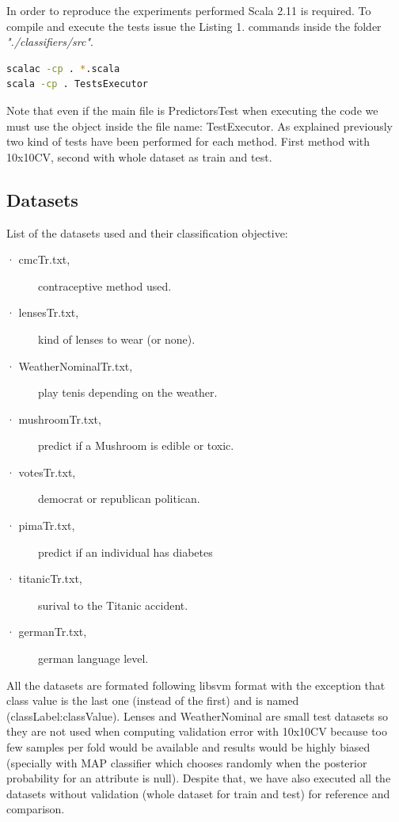 \documentclass[a4paper,10pt]{article}
\begin{document}
In order to reproduce the experiments performed Scala 2.11 is required. To compile and execute the tests issue the Listing 1. commands inside the folder \textit{"./classifiers/src"}.

\begin{lstlisting}[language=bash,caption={Compilation and execution commands to reproduce reported results}]
scalac -cp . *.scala
scala -cp . TestsExecutor
\end{lstlisting}

Note that even if the main file is PredictorsTest when executing the code we must use the object inside the file name: TestExecutor.
As explained previously two kind of tests have been performed for each method. First method with 10x10CV, second with whole dataset as train and test. 

\subsection{Datasets}
\label{subsec:datasets}

List of the datasets used and their classification objective:

\begin{description}
 \item [· cmcTr.txt,] contraceptive method used.
 \item [· lensesTr.txt,] kind of lenses to wear (or none).
 \item [· WeatherNominalTr.txt,] play tenis depending on the weather.
 \item [· mushroomTr.txt,] predict if a Mushroom is edible or toxic.
 \item [· votesTr.txt,] democrat or republican politican.
 \item [· pimaTr.txt,] predict if an individual has diabetes \cite{Smith}
 \item [· titanicTr.txt,] surival to the Titanic accident.
 \item [· germanTr.txt,] german language level.
\end{description}

All the datasets are formated following libsvm format with the exception that class value is the last one (instead of the first) and is named (classLabel:classValue). Lenses and WeatherNominal are small test datasets so they are not used when computing validation error with 10x10CV because too few samples per fold would be available and results would be highly biased (specially with MAP classifier which chooses randomly when the posterior probability for an attribute is null). Despite that, we have also executed all the datasets without validation (whole dataset for train and test) for reference and comparison.
\end{document}
